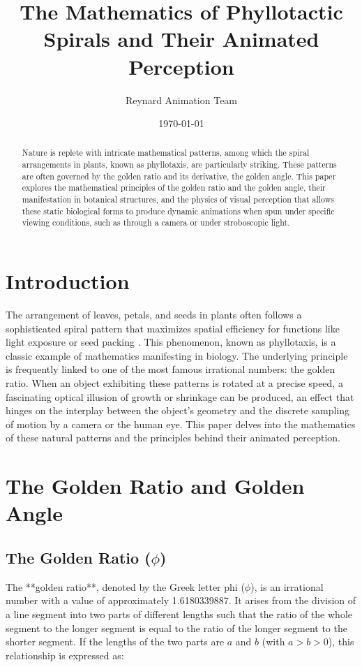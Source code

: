 \documentclass[12pt, a4paper]{article}
\title{The Mathematics of Phyllotactic Spirals and Their Animated Perception}
\author{Reynard Animation Team}
\date{\today}
\begin{document}
\maketitle

\begin{abstract}
Nature is replete with intricate mathematical patterns, among which the spiral arrangements in plants, known as phyllotaxis, are particularly striking. These patterns are often governed by the golden ratio and its derivative, the golden angle. This paper explores the mathematical principles of the golden ratio and the golden angle, their manifestation in botanical structures, and the physics of visual perception that allows these static biological forms to produce dynamic animations when spun under specific viewing conditions, such as through a camera or under stroboscopic light.
\end{abstract}

\section{Introduction}

The arrangement of leaves, petals, and seeds in plants often follows a sophisticated spiral pattern that maximizes spatial efficiency for functions like light exposure or seed packing \cite{Jean1994}. This phenomenon, known as phyllotaxis, is a classic example of mathematics manifesting in biology. The underlying principle is frequently linked to one of the most famous irrational numbers: the golden ratio. When an object exhibiting these patterns is rotated at a precise speed, a fascinating optical illusion of growth or shrinkage can be produced, an effect that hinges on the interplay between the object's geometry and the discrete sampling of motion by a camera or the human eye. This paper delves into the mathematics of these natural patterns and the principles behind their animated perception.

\section{The Golden Ratio and Golden Angle}

\subsection{The Golden Ratio ($\phi$)}

The **golden ratio**, denoted by the Greek letter phi ($\phi$), is an irrational number with a value of approximately 1.6180339887. It arises from the division of a line segment into two parts of different lengths such that the ratio of the whole segment to the longer segment is equal to the ratio of the longer segment to the shorter segment. If the lengths of the two parts are $a$ and $b$ (with $a > b > 0$), this relationship is expressed as:
\end{document}
